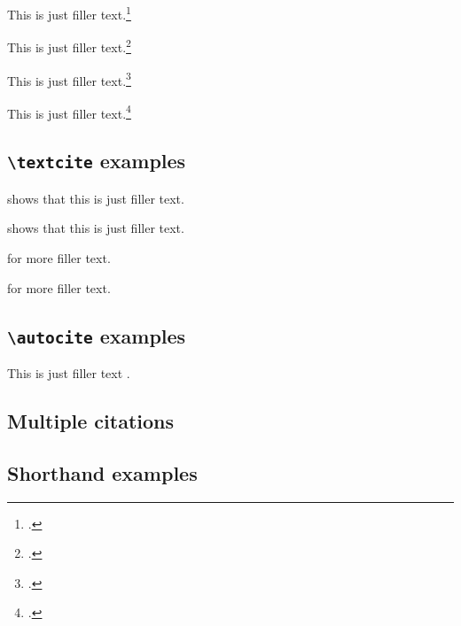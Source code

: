 \documentclass[a4paper]{article}
\newcommand{\cmd}[1]{\texttt{\textbackslash #1}}
\begin{document}
This is just filler text.\footcite{aristotle:rhetoric}

This is just filler text.\footcite[59]{aristotle:rhetoric}

This is just filler text.\footcite[See][]{aristotle:rhetoric}

This is just filler text.\footcite[See][59--63]{aristotle:rhetoric}

\subsection*{\cmd{textcite} examples}

\textcite{aristotle:rhetoric} shows that this is just filler text.

\textcite[59]{aristotle:rhetoric} shows that this is just filler text.

\textcite[See][]{aristotle:rhetoric} for more filler text.

\textcite[See][59--63]{aristotle:rhetoric} for more filler text.

\subsection*{\cmd{autocite} examples}


This is just filler text \autocite{aristotle:rhetoric}.

\subsection*{Multiple citations}


\cite{aristotle:rhetoric,aristotle:physics,aristotle:poetics}

\subsection*{Shorthand examples}


\cite{kant:kpv,kant:ku}

\clearpage


\printshorthands


\nocite{*}
\printbibliography
\end{document}
